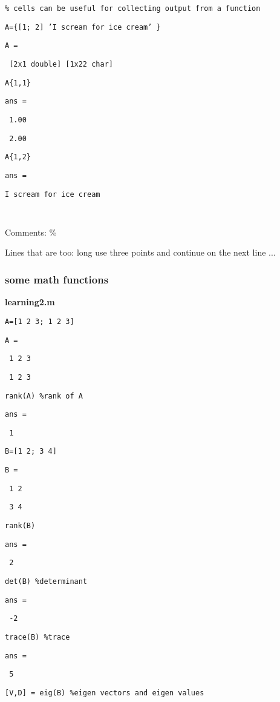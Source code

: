 \documentclass[12pt,a4paper]{article}
\begin{document}
\texttt{\% cells can be useful for collecting output from a function}

\texttt{A=\{[1; 2] 'I scream for ice cream' \}}

\texttt{A = }

\texttt{\ [2x1 double] [1x22 char]}

\texttt{A\{1,1\}}

\texttt{ans =}

\texttt{\ 1.00}

\texttt{\ 2.00}

\texttt{A\{1,2\}}

\texttt{ans =}

\texttt{I scream for ice cream}

\texttt{\TEXTsymbol{>}\TEXTsymbol{>} }

Comments: \%

Lines that are too: long use three points and continue on the next line ...

\bigskip

\subsubsection{some math functions}

\textbf{learning2.m}

\texttt{A=[1 2 3; 1 2 3]}

\texttt{A =}

\texttt{\ 1 2 3}

\texttt{\ 1 2 3}

\texttt{rank(A) \%rank of A}

\texttt{ans =}

\texttt{\ 1}

\texttt{B=[1 2; 3 4]}

\texttt{B =}

\texttt{\ 1 2}

\texttt{\ 3 4}

\texttt{rank(B)}

\texttt{ans =}

\texttt{\ 2}

\texttt{det(B) \%determinant}

\texttt{ans =}

\texttt{\ -2}

\texttt{trace(B) \%trace}

\texttt{ans =}

\texttt{\ 5}

\texttt{[V,D] = eig(B) \%eigen vectors and eigen values}
\end{document}
